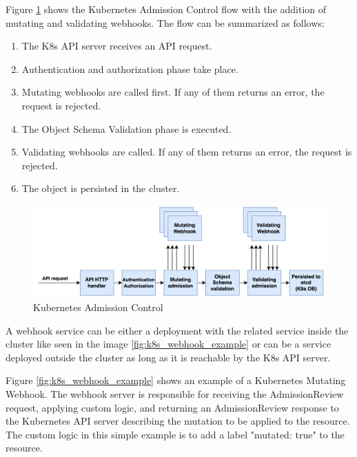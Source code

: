 Figure \ref{fig:k8s_admission_control} shows the Kubernetes Admission Control flow with the addition of mutating and validating webhooks.
The flow can be summarized as follows:
\begin{enumerate}[itemsep=0.2pt, topsep=1pt]
  \item The K8s API server receives an API request.
  \item Authentication and authorization phase take place.
  \item Mutating webhooks are called first. If any of them returns an error, the request is rejected.
  \item The Object Schema Validation phase is executed.
  \item Validating webhooks are called. If any of them returns an error, the request is rejected.
  \item The object is persisted in the cluster.
\end{enumerate}

\begin{figure}[t]
  \centering
  \includegraphics[width=1\linewidth]{images/k8s_admission.png}
  \caption{Kubernetes Admission Control}
  \label{fig:k8s_admission_control}
\end{figure}

A webhook service can be either a deployment with the related service inside the cluster like seen in the image \ref{fig:k8s_webhook_example} or can be a service deployed outside the cluster as long as it is reachable by the K8s API server.

Figure \ref{fig:k8s_webhook_example} shows an example of a Kubernetes Mutating Webhook. 
The webhook server is responsible for receiving the AdmissionReview request, applying custom logic, and returning an AdmissionReview response to the Kubernetes API server describing the mutation to be applied to the resource.
The custom logic in this simple example is to add a label "mutated: true" to the resource.

